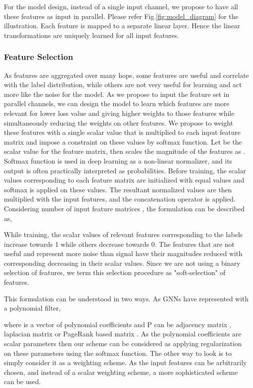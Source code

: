 \documentclass[sigconf,natbib=false]{acmart}
\begin{document}
For the model design, instead of a single input channel, we propose to have all these features as input in parallel. Please refer Fig.\ref{fig:model_diagram} for the illustration.  Each feature is mapped to a separate linear layer. Hence the linear transformations are uniquely learned for all input features. 

\subsubsection{Feature Selection}\hfill

As features are aggregated over many hops, some features are useful and correlate with the label distribution, while others are not very useful for learning and act more like the noise for the model. As we propose to input the feature set in parallel channels, we can design the model to learn which features are more relevant for lower loss value and giving higher weights to those features while simultaneously reducing the weights on other features. We propose to weight these features with a single scalar value that is multiplied to each input feature matrix and impose a constraint on these values by softmax function. Let  be the scalar value for the  feature matrix, then  scales the magnitude of the features as . Softmax function is used in deep learning as a non-linear normalizer, and its output is often practically interpreted as probabilities. Before training, the scalar values corresponding to each feature matrix are initialized with equal values and softmax is applied on these values. The resultant normalized values  are then multiplied with the input features, and the concatenation operator is applied. Considering  number of input feature matrices  , the formulation can be described as,






 While training, the scalar values of relevant features corresponding to the labels increase towards 1 while others decrease towards 0. The features that are not useful and represent more noise than signal have their magnitudes reduced with corresponding decreasing in their scalar values. Since we are not using a binary selection of features, we term this selection procedure as "soft-selection" of features.
 

This formulation can be understood in two ways. As GNNs have represented with a polynomial filter, 



where  is a vector of polynomial coefficients and P can be adjacency matrix \cite{kipf_semi-supervised_2017}\cite{chen_simple_2020}, laplacian matrix \cite{nt_stacked_2020} or PageRank based matrix \cite{berberidis_adaptive_2019}. As the polynomial coefficients are scalar parameters then our scheme can be considered as applying regularization on these parameters using the softmax function. The other way to look is to simply consider it as a weighting scheme. As the input features can be arbitrarily chosen, and instead of a scalar weighting scheme, a more sophisticated scheme can be used. 
\end{document}

